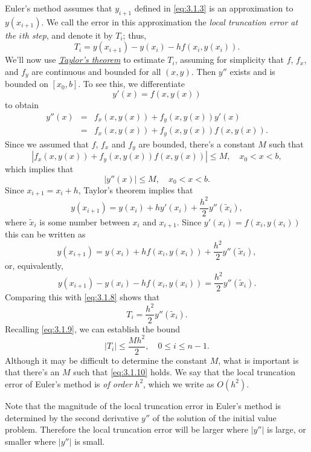 Euler's method assumes that $y_{i+1}$ defined in \eqref{eq:3.1.3} is an approximation to
$y(x_{i+1})$. We call the error in this approximation the {\color{blue}\it local truncation error at
the $i$th step\/}, and denote it by $T_{i}$; thus,
\begin{equation}
  \label{eq:3.1.8}T_{i}=y(x_{i+1})-y(x_{i})-hf(x_{i},y(x_{i})).
\end{equation}
We'll now use
\href{https://mathshistory.st-andrews.ac.uk/Biographies/Taylor/}{\color{blue}
\it Taylor's theorem\/}
to estimate $T_{i}$, assuming for simplicity that $f$, $f_{x}$, and $f_{y}$ are continuous and
bounded for all $(x,y)$. Then $y''$ exists and is bounded on $[x_{0},b]$. To see this, we
differentiate
\[
  y'(x)=f(x,y(x))
\]
to obtain
\begin{eqnarray*}
  y''(x) & = & f_{x}(x,y(x))+f_{y}(x,y(x))y'(x) \\
         & = & f_{x}(x,y(x))+f_{y}(x,y(x))f(x,y(x)).
\end{eqnarray*}
Since we assumed that $f$, $f_{x}$ and $f_{y}$ are bounded, there's a constant $M$ such that
\[
  |f_{x}(x,y(x))+f_{y}(x,y(x))f(x,y(x))|\le M,\quad x_{0}<x<b,
\]
which implies that
\begin{equation}
  \label{eq:3.1.9}|y''(x)|\le M,\quad x_{0}<x<b.
\end{equation}
Since $x_{i+1}=x_{i}+h$, Taylor's theorem implies that
\[
  y(x_{i+1})=y(x_{i})+hy'(x_{i})+\frac{h^{2}}{2}y''(\tilde{x}_{i}),
\]
where $\tilde{x}_{i}$ is some number between $x_{i}$ and $x_{i+1}$. Since
$y'(x_{i})=f(x_{i},y(x_{i}))$ this can be written as
\[
  y(x_{i+1})=y(x_{i})+hf(x_{i},y(x_{i}))+\frac{h^{2}}{2}y''(\tilde{x}_{i}),
\]
or, equivalently,
\[
  y(x_{i+1})-y(x_{i})-hf(x_{i},y(x_{i}))=\frac{h^{2}}{2}y''(\tilde{x}_{i}).
\]
Comparing this with \eqref{eq:3.1.8} shows that
\[
  T_{i}=\frac{h^{2}}{2}y''(\tilde{x}_{i}).
\]
Recalling \eqref{eq:3.1.9}, we can establish the bound
\begin{equation}
  \label{eq:3.1.10}|T_{i}|\le\frac{Mh^{2}}{2},\quad 0\le i\le n-1.
\end{equation}
Although it may be difficult to determine the constant $M$, what is important is that there's an $M$
such that \eqref{eq:3.1.10} holds. We say that the local truncation error of Euler's method is
{\color{blue}\it of order\/} $h^{2}$, which we write as $O(h^{2})$.

Note that the magnitude of the local truncation error in Euler's method is determined by the second
derivative $y''$ of the solution of the initial value problem. Therefore the local truncation error
will be larger where $|y''|$ is large, or smaller where $|y''|$ is small.


